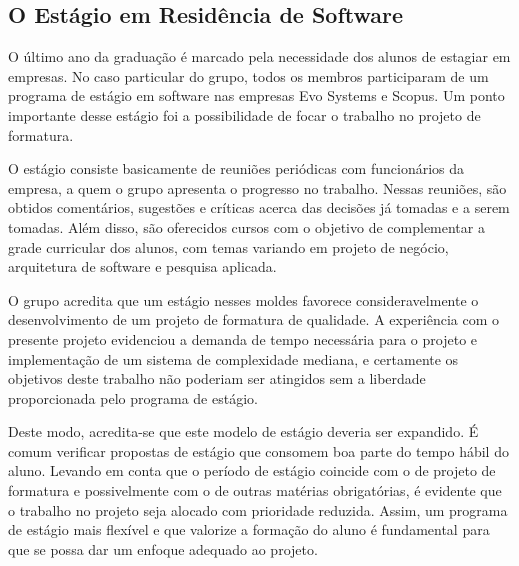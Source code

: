 \subsection{O Estágio em Residência de Software}
O último ano da graduação é marcado pela necessidade dos alunos de estagiar em empresas. No caso particular do grupo, todos os membros participaram de um programa de estágio em software nas empresas Evo Systems e Scopus. Um ponto importante desse estágio foi a possibilidade de focar o trabalho no projeto de formatura.

O estágio consiste basicamente de reuniões periódicas com funcionários da empresa, a quem o grupo apresenta o progresso no trabalho. Nessas reuniões, são obtidos comentários, sugestões e críticas acerca das decisões já tomadas e a serem tomadas. Além disso, são oferecidos cursos com o objetivo de complementar a grade curricular dos alunos, com temas variando em projeto de negócio, arquitetura de software e pesquisa aplicada.

O grupo acredita que um estágio nesses moldes favorece consideravelmente o desenvolvimento de um projeto de formatura de qualidade. A experiência com o presente projeto evidenciou a demanda de tempo necessária para o projeto e implementação de um sistema de complexidade mediana, e certamente os objetivos deste trabalho não poderiam ser atingidos sem a liberdade proporcionada pelo programa de estágio.

Deste modo, acredita-se que este modelo de estágio deveria ser expandido. É comum verificar propostas de estágio que consomem boa parte do tempo hábil do aluno. Levando em conta que o período de estágio coincide com o de projeto de formatura e possivelmente com o de outras matérias obrigatórias, é evidente que o trabalho no projeto seja alocado com prioridade reduzida. Assim, um programa de estágio mais flexível e que valorize a formação do aluno é fundamental para que se possa dar um enfoque adequado ao projeto.